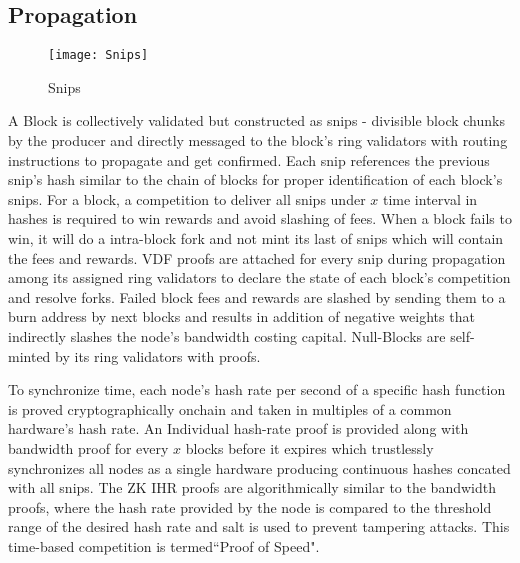 \documentclass[../Bitcoin Blink.tex]{subfiles}
\begin{document}
\subsection{Propagation}
\begin{figure}[H]
\begin{center}
\texttt{[image: Snips]}
\caption{Snips}
\end{center}
\end{figure}
A Block is collectively validated but constructed as snips - divisible block chunks by the producer and directly messaged to the block's ring validators with routing instructions to propagate and get confirmed. Each snip references the previous snip's hash similar to the chain of blocks for proper identification of each block's snips. For a block, a competition to deliver all snips under $x$ time interval in hashes is required to win rewards and avoid slashing of fees. When a block fails to win, it will do a intra-block fork and not mint its last of snips which will contain the fees and rewards. VDF proofs are attached for every snip during propagation among its assigned ring validators to declare the state of each block's competition and resolve forks. Failed block fees and rewards are slashed by sending them to a burn address by next blocks and results in addition of negative weights that indirectly slashes the node's bandwidth costing capital. Null-Blocks are self-minted by its ring validators with proofs.

To synchronize time, each node's hash rate per second of a specific hash function is proved cryptographically onchain and taken in multiples of a common hardware's hash rate. An Individual hash-rate proof is provided along with bandwidth proof for every $x$ blocks before it expires which trustlessly synchronizes all nodes as a single hardware producing continuous hashes concated with all snips. The ZK IHR proofs are algorithmically similar to the bandwidth proofs, where the hash rate provided by the node is compared to the threshold range of the desired hash rate and salt is used to prevent tampering attacks. This time-based competition is termed``Proof of Speed".
\end{document}
